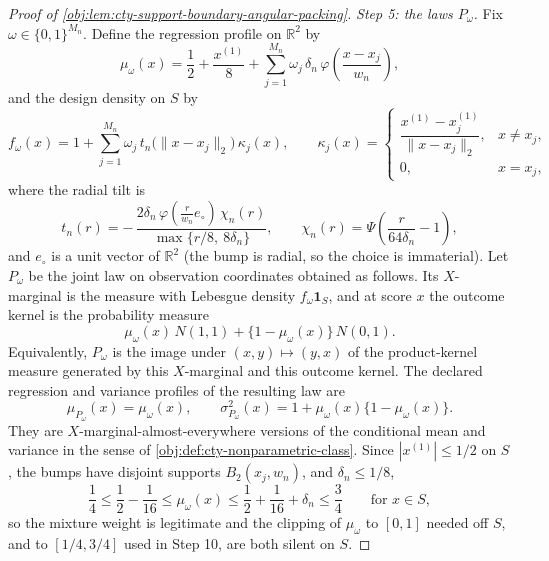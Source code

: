 \begin{proof}[Proof of \cref{obj:lem:cty-support-boundary-angular-packing}]
\emph{Step 5: the laws \(P_\omega\).}  Fix \(\omega\in\{0,1\}^{M_n}\).  Define the regression profile on \(\mathbb R^2\) by
\[
\mu_\omega(x)
=
\frac12+\frac{x^{(1)}}{8}
+
\sum_{j=1}^{M_n}\omega_j\,\delta_n\,
\varphi\!\left(\frac{x-x_j}{w_n}\right),
\]
and the design density on \(S\) by
\[
f_\omega(x)
=
1+\sum_{j=1}^{M_n}\omega_j\,
t_n\bigl(\lVert x-x_j\rVert_2\bigr)\,\kappa_j(x),
\qquad
\kappa_j(x)=
\begin{cases}
\dfrac{x^{(1)}-x_j^{(1)}}{\lVert x-x_j\rVert_2}, & x\ne x_j,\\[2mm]
0,& x=x_j,
\end{cases}
\]
where the radial tilt is
\[
t_n(r)
=
-\,\frac{2\delta_n\,\varphi\!\left(\tfrac{r}{w_n}e_\circ\right)\,\chi_n(r)}
{\max\{r/8,\ 8\delta_n\}},
\qquad
\chi_n(r)=\Psi\!\left(\frac{r}{64\delta_n}-1\right),
\]
and \(e_\circ\) is a unit vector of \(\mathbb R^2\) (the bump is radial, so the choice is immaterial).
Let \(P_\omega\) be the joint law on observation coordinates obtained as follows.  Its \(X\)-marginal is the measure with Lebesgue density \(f_\omega\mathbf 1_S\), and at score \(x\) the outcome kernel is the probability measure
\[
\mu_\omega(x)\,N(1,1)+\{1-\mu_\omega(x)\}\,N(0,1).
\]
Equivalently, \(P_\omega\) is the image under \((x,y)\mapsto(y,x)\) of the product-kernel measure generated by this \(X\)-marginal and this outcome kernel.  The declared regression and variance profiles of the resulting law are
\[
\mu_{P_\omega}(x)=\mu_\omega(x),
\qquad
\sigma^2_{P_\omega}(x)=1+\mu_\omega(x)\{1-\mu_\omega(x)\}.
\]
They are \(X\)-marginal-almost-everywhere versions of the conditional mean and variance in the sense of \cref{obj:def:cty-nonparametric-class}.
Since \(|x^{(1)}|\le1/2\) on \(S\), the bumps have disjoint supports \(B_2(x_j,w_n)\), and \(\delta_n\le1/8\),
\[
\frac14\le\frac12-\frac1{16}\le\mu_\omega(x)\le\frac12+\frac1{16}+\delta_n\le\frac34
\qquad\text{for }x\in S,
\]
so the mixture weight is legitimate and the clipping of \(\mu_\omega\) to \([0,1]\) needed off \(S\), and to \([1/4,3/4]\) used in Step 10, are both silent on \(S\).


\end{proof}
